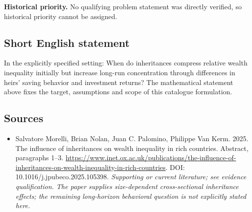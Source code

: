 \documentclass[11pt]{article}
\begin{document}
\par\textbf{Historical priority.} No qualifying problem statement was directly verified, so historical priority cannot be assigned.

\subsection{Short English statement}
In the explicitly specified setting: When do inheritances compress relative wealth inequality initially but increase long-run concentration through differences in heirs' saving behavior and investment returns? The mathematical statement above fixes the target, assumptions and scope of this catalogue formulation.

\subsection{Sources}
\begin{itemize}\raggedright
\item[\textnormal{[S1]}]\hypertarget{source:30007651:1}{} Salvatore Morelli, Brian Nolan, Juan C. Palomino, Philippe Van Kerm. 2025. The influence of inheritances on wealth inequality in rich countries. Abstract, paragraphs 1–3.
\url{https://www.inet.ox.ac.uk/publications/the-influence-of-inheritances-on-wealth-inequality-in-rich-countries}.
DOI: 10.1016/j.jpubeco.2025.105398.
{\small\textit{Supporting or current literature; see evidence qualification. The paper supplies size-dependent cross-sectional inheritance effects; the remaining long-horizon behavioral question is not explicitly stated here.}}
\end{itemize}
\end{document}
